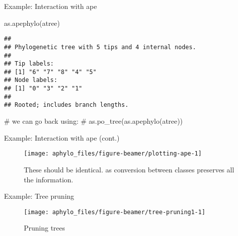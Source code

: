 \documentclass[9pt,ignorenonframetext,]{beamer}
\newenvironment{Shaded}{\begin{snugshade}}{\end{snugshade}}
\newcommand{\KeywordTok}[1]{\textcolor[rgb]{0.94,0.87,0.69}{#1}}
\newcommand{\CommentTok}[1]{\textcolor[rgb]{0.50,0.62,0.50}{#1}}
\newcommand{\NormalTok}[1]{\textcolor[rgb]{0.80,0.80,0.80}{#1}}
\begin{document}
\begin{frame}[fragile,t]{Example: Interaction with ape}

\footnotesize

\begin{Shaded}
\begin{Highlighting}[]
\KeywordTok{as.apephylo}\NormalTok{(atree)}
\end{Highlighting}
\end{Shaded}

\begin{verbatim}
## 
## Phylogenetic tree with 5 tips and 4 internal nodes.
## 
## Tip labels:
## [1] "6" "7" "8" "4" "5"
## Node labels:
## [1] "0" "3" "2" "1"
## 
## Rooted; includes branch lengths.
\end{verbatim}

\begin{Shaded}
\begin{Highlighting}[]
\CommentTok{# we can go back using:}
\CommentTok{# as.po_tree(as.apephylo(atree))}
\end{Highlighting}
\end{Shaded}

\normalsize

\end{frame}

\begin{frame}[t]{Example: Interaction with ape (cont.)}

\footnotesize

\begin{figure}

{\centering \texttt{[image: aphylo\_files/figure-beamer/plotting-ape-1]} 

}

\caption{These should be identical. as conversion between classes preserves all the information.}\label{fig:plotting-ape}
\end{figure}

\normalsize

\end{frame}

\begin{frame}[t]{Example: Tree pruning}

\footnotesize

\begin{figure}

{\centering \texttt{[image: aphylo\_files/figure-beamer/tree-pruning1-1]} 

}

\caption{Pruning trees}\label{fig:tree-pruning1}
\end{figure}

\normalsize

\end{frame}
\end{document}

